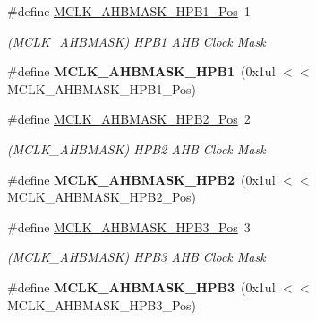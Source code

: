 \begin{DoxyCompactItemize}
\item 
\hypertarget{group___s_a_m_l21___m_c_l_k_gad500245362fc27f25dbd1cd872403db5}{}\#define \hyperlink{group___s_a_m_l21___m_c_l_k_gad500245362fc27f25dbd1cd872403db5}{M\+C\+L\+K\+\_\+\+A\+H\+B\+M\+A\+S\+K\+\_\+\+H\+P\+B1\+\_\+\+Pos}~1\label{group___s_a_m_l21___m_c_l_k_gad500245362fc27f25dbd1cd872403db5}

\begin{DoxyCompactList}\small\item\em (M\+C\+L\+K\+\_\+\+A\+H\+B\+M\+A\+S\+K) H\+P\+B1 A\+H\+B Clock Mask \end{DoxyCompactList}\item 
\hypertarget{group___s_a_m_l21___m_c_l_k_gaba05d82d3b9053c8634f5644410059fe}{}\#define {\bfseries M\+C\+L\+K\+\_\+\+A\+H\+B\+M\+A\+S\+K\+\_\+\+H\+P\+B1}~(0x1ul $<$$<$ M\+C\+L\+K\+\_\+\+A\+H\+B\+M\+A\+S\+K\+\_\+\+H\+P\+B1\+\_\+\+Pos)\label{group___s_a_m_l21___m_c_l_k_gaba05d82d3b9053c8634f5644410059fe}

\item 
\hypertarget{group___s_a_m_l21___m_c_l_k_gad85e221b80ccea1b2fb40ccd57361831}{}\#define \hyperlink{group___s_a_m_l21___m_c_l_k_gad85e221b80ccea1b2fb40ccd57361831}{M\+C\+L\+K\+\_\+\+A\+H\+B\+M\+A\+S\+K\+\_\+\+H\+P\+B2\+\_\+\+Pos}~2\label{group___s_a_m_l21___m_c_l_k_gad85e221b80ccea1b2fb40ccd57361831}

\begin{DoxyCompactList}\small\item\em (M\+C\+L\+K\+\_\+\+A\+H\+B\+M\+A\+S\+K) H\+P\+B2 A\+H\+B Clock Mask \end{DoxyCompactList}\item 
\hypertarget{group___s_a_m_l21___m_c_l_k_ga4195e6c352a7882bd03c3a0e41a711be}{}\#define {\bfseries M\+C\+L\+K\+\_\+\+A\+H\+B\+M\+A\+S\+K\+\_\+\+H\+P\+B2}~(0x1ul $<$$<$ M\+C\+L\+K\+\_\+\+A\+H\+B\+M\+A\+S\+K\+\_\+\+H\+P\+B2\+\_\+\+Pos)\label{group___s_a_m_l21___m_c_l_k_ga4195e6c352a7882bd03c3a0e41a711be}

\item 
\hypertarget{group___s_a_m_l21___m_c_l_k_ga0fde493e6b6f196f2f5097f561c77fa3}{}\#define \hyperlink{group___s_a_m_l21___m_c_l_k_ga0fde493e6b6f196f2f5097f561c77fa3}{M\+C\+L\+K\+\_\+\+A\+H\+B\+M\+A\+S\+K\+\_\+\+H\+P\+B3\+\_\+\+Pos}~3\label{group___s_a_m_l21___m_c_l_k_ga0fde493e6b6f196f2f5097f561c77fa3}

\begin{DoxyCompactList}\small\item\em (M\+C\+L\+K\+\_\+\+A\+H\+B\+M\+A\+S\+K) H\+P\+B3 A\+H\+B Clock Mask \end{DoxyCompactList}\item 
\hypertarget{group___s_a_m_l21___m_c_l_k_ga98288687816bc464a0a8372ad889dd3e}{}\#define {\bfseries M\+C\+L\+K\+\_\+\+A\+H\+B\+M\+A\+S\+K\+\_\+\+H\+P\+B3}~(0x1ul $<$$<$ M\+C\+L\+K\+\_\+\+A\+H\+B\+M\+A\+S\+K\+\_\+\+H\+P\+B3\+\_\+\+Pos)\label{group___s_a_m_l21___m_c_l_k_ga98288687816bc464a0a8372ad889dd3e}


\end{DoxyCompactItemize}
